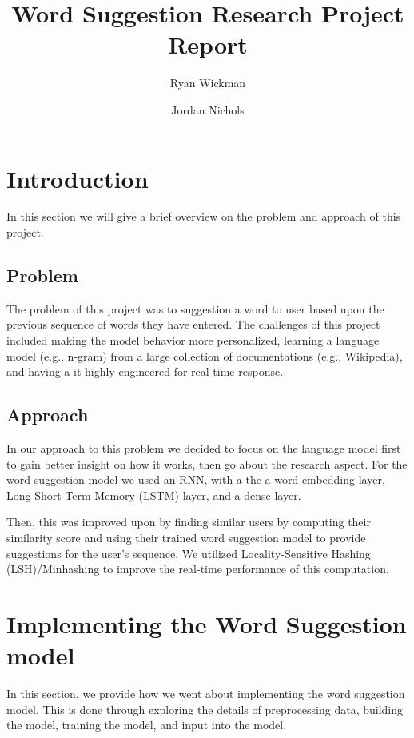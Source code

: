 \documentclass[sigconf]{acmart}
\begin{document}
\title{Word Suggestion Research Project Report}

\author{Ryan Wickman}

\author{Jordan Nichols}

\maketitle

\section{Introduction}
In this section we will give a brief overview on the problem and approach of this project.
\subsection{Problem}
The problem of this project was to suggestion a word to user based upon the previous sequence of words they have entered. The challenges of this project included making the model behavior more personalized, learning a language model (e.g., n-gram) from a large collection of documentations (e.g., Wikipedia), and having a it highly engineered for real-time response.
\subsection{Approach}
In our approach to this problem we decided to focus on the language model first to gain better insight on how it works, then go about the research aspect. For the word suggestion model we used an RNN, with a the a word-embedding layer, Long Short-Term Memory (LSTM) layer, and a dense layer.

Then, this was improved upon by finding similar users by computing their similarity score and using their trained word suggestion model to provide suggestions for the user's sequence. We utilized Locality-Sensitive Hashing (LSH)/Minhashing to improve the real-time performance of this computation.

\section{Implementing the Word Suggestion model}
In this section, we provide how we went about implementing the word suggestion model. This is done through exploring the details of preprocessing data, building the model, training the model, and input into the model.
\end{document}
